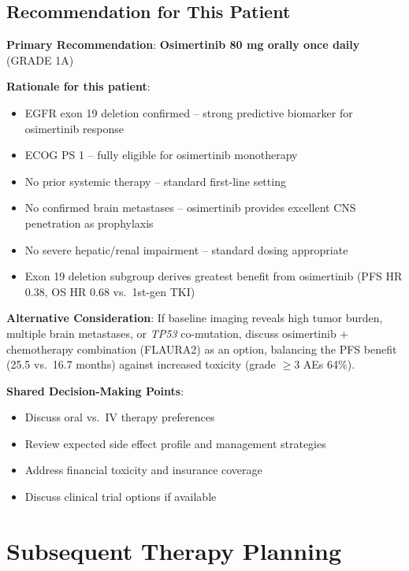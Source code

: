 \documentclass[10pt,letterpaper]{article}
\begin{document}
\subsection{Recommendation for This Patient}

\begin{tcolorbox}[enhanced,colback=stronggreen!8,colframe=stronggreen,
title={\textbf{Recommended First-Line Treatment}},
fonttitle=\bfseries\small,coltitle=black]
{\small
\textbf{Primary Recommendation}: \textbf{Osimertinib 80 mg orally once daily} (GRADE 1A)

\textbf{Rationale for this patient}:
\begin{itemize}
\item EGFR exon 19 deletion confirmed -- strong predictive biomarker for osimertinib response
\item ECOG PS 1 -- fully eligible for osimertinib monotherapy
\item No prior systemic therapy -- standard first-line setting
\item No confirmed brain metastases -- osimertinib provides excellent CNS penetration as prophylaxis
\item No severe hepatic/renal impairment -- standard dosing appropriate
\item Exon 19 deletion subgroup derives greatest benefit from osimertinib (PFS HR 0.38, OS HR 0.68 vs.~1st-gen TKI)
\end{itemize}

\textbf{Alternative Consideration}: If baseline imaging reveals high tumor burden, multiple brain metastases, or \textit{TP53} co-mutation, discuss osimertinib + chemotherapy combination (FLAURA2) as an option, balancing the PFS benefit (25.5 vs.~16.7 months) against increased toxicity (grade $\geq$3 AEs 64\%).

\textbf{Shared Decision-Making Points}:
\begin{itemize}
\item Discuss oral vs.~IV therapy preferences
\item Review expected side effect profile and management strategies
\item Address financial toxicity and insurance coverage
\item Discuss clinical trial options if available
\end{itemize}
}
\end{tcolorbox}

\section{Subsequent Therapy Planning}
\end{document}
